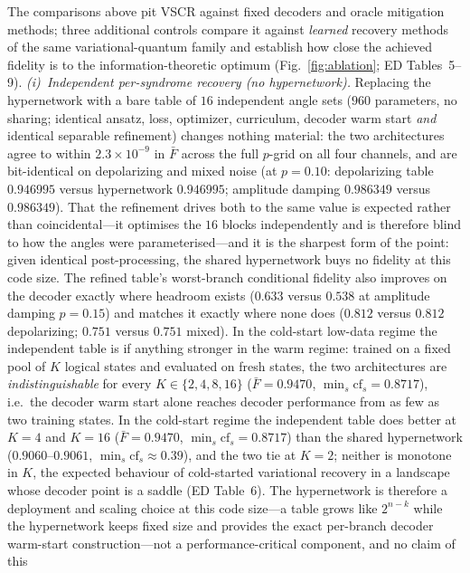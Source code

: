\documentclass[aps,prxquantum,reprint,superscriptaddress]{revtex4-2}
\begin{document}
The comparisons above pit VSCR against fixed decoders and oracle mitigation
methods; three additional controls compare it against \emph{learned}
recovery methods of the same variational-quantum family and establish how
close the achieved fidelity is to the information-theoretic optimum
(Fig.~\ref{fig:ablation}; ED Tables~5--9).
\emph{(i)~Independent per-syndrome recovery (no hypernetwork).} Replacing
the hypernetwork with a bare table of $16$ independent angle sets
($960$ parameters, no sharing; identical ansatz, loss, optimizer, curriculum,
decoder warm start \emph{and} identical separable refinement) changes nothing
material: the two architectures agree to within $2.3\times10^{-9}$ in $\bar F$
across the full $p$-grid on all four channels, and are bit-identical on
depolarizing and mixed noise (at $p=0.10$: depolarizing table $0.946995$ versus
hypernetwork $0.946995$; amplitude damping $0.986349$ versus $0.986349$). That
the refinement drives both to the same value is expected rather than
coincidental---it optimises the $16$ blocks independently and is therefore blind
to how the angles were parameterised---and it is the sharpest form of the point:
given identical post-processing, the shared hypernetwork buys no fidelity at this
code size. The refined table's worst-branch conditional fidelity also improves on
the decoder exactly where headroom exists ($0.633$ versus $0.538$ at amplitude
damping $p=0.15$) and matches it exactly where none does ($0.812$ versus $0.812$
depolarizing; $0.751$ versus $0.751$ mixed). In the cold-start low-data regime the independent table is if
anything stronger in the warm regime: trained on a fixed pool of $K$ logical
states and evaluated on fresh states, the two architectures are
\emph{indistinguishable} for every $K\in\{2,4,8,16\}$ ($\bar F=0.9470$,
$\min_s\mathrm{cf}_s=0.8717$), i.e.\ the decoder warm start alone reaches decoder
performance from as few as two training states. In the cold-start regime the
independent table does better at $K{=}4$ and $K{=}16$ ($\bar F=0.9470$,
$\min_s\mathrm{cf}_s=0.8717$) than the shared hypernetwork ($0.9060$--$0.9061$,
$\min_s\mathrm{cf}_s\approx0.39$), and the two tie at $K{=}2$; neither is monotone
in $K$, the expected behaviour of cold-started variational recovery in a
landscape whose decoder point is a saddle (ED Table~6). The hypernetwork is
therefore a deployment and scaling choice
at this code size---a table grows like $2^{n-k}$ while the hypernetwork
keeps fixed size and provides the exact per-branch decoder warm-start
construction---not a performance-critical component, and no claim of this
\end{document}
